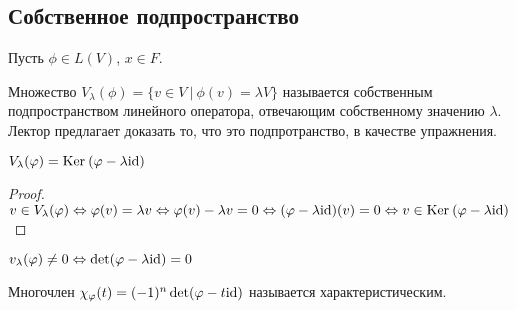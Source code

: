 \subsection*{Собственное подпространство}
Пусть $\phi\in L(V)$, $x\in F$. 
\begin{Def}
    Множество $V_{\lambda}(\phi) = \{v\in V\ |\ \phi(v) = \lambda V\}$ называется собственным подпространством линейного оператора, отвечающим собственному значению $\lambda$. Лектор предлагает доказать то, что это подпротранство, в качестве упражнения.
\end{Def}
\begin{Suggestion}
    $V_\lambda(\varphi) = \mathrm{Ker}\:(\varphi - \lambda\mathrm{id})$
\end{Suggestion}
\begin{proof}
    $v \in V_{\lambda}(\varphi) \Leftrightarrow \varphi(v) = \lambda v \Leftrightarrow \varphi(v) - \lambda v = 0 \Leftrightarrow (\varphi - \lambda \mathrm{id})(v) = 0  \Leftrightarrow v \in \mathrm{Ker}\:(\varphi - \lambda \mathrm{id})$
\end{proof}
\begin{Consequence}
    $v_{\lambda}(\varphi) \neq 0 \Leftrightarrow \det(\varphi - \lambda \mathrm{id}) = 0$
\end{Consequence}
\begin{Def}
    Многочлен $\chi_{\varphi}(t) = (-1)^n\det(\varphi - t \mathrm{id})$ называется характеристическим.
\end{Def}

